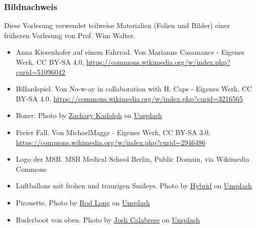 \documentclass{beamer}
\begin{document}
\begin{frame}
\frametitle{Bildnachweis}
 
Diese Vorlesung verwendet teilweise Materialien (Folien und Bilder) einer früheren Vorlesung von Prof. Wim Walter.  

\vfill

\begin{tiny}
 
\begin{itemize}

\item
Anna Kiesenhofer auf einem Fahrrad. Von Marianne Casamance - Eigenes Werk, CC BY-SA 4.0, \url{https://commons.wikimedia.org/w/index.php?curid=51096042}

\item
Billardspiel. Von No-w-ay in collaboration with H. Caps - Eigenes Werk, CC BY-SA 4.0, \url{https://commons.wikimedia.org/w/index.php?curid=3216565}

\item
Boxer. Photo by \href{https://unsplash.com/@zacharykadolph?utm_source=unsplash&utm_medium=referral&utm_content=creditCopyText}{Zachary Kadolph} on \href{https://unsplash.com/s/photos/boxer?utm_source=unsplash&utm_medium=referral&utm_content=creditCopyText}{Unsplash}

\item
Freier Fall. Von MichaelMaggs - Eigenes Werk, CC BY-SA 3.0, \url{https://commons.wikimedia.org/w/index.php?curid=2946486}

\item
Logo der MSB. MSB Medical School Berlin, Public Domain, via Wikimedia Commons

\item
Luftballons mit frohen und traurigen Smileys. Photo by \href{https://unsplash.com/@artbyhybrid?utm_source=unsplash&utm_medium=referral&utm_content=creditCopyText}{Hybrid} on \href{https://unsplash.com/s/photos/feedback?utm_source=unsplash&utm_medium=referral&utm_content=creditCopyText}{Unsplash}
  
\item
Pirouette. Photo by \href{https://unsplash.com/@rodlong?utm_source=unsplash&utm_medium=referral&utm_content=creditCopyText}{Rod Long} on \href{https://unsplash.com/s/photos/figure-skater?utm_source=unsplash&utm_medium=referral&utm_content=creditCopyText}{Unsplash}  

\item
Ruderboot von oben. Photo by \href{https://unsplash.com/@joshcala?utm_source=unsplash&utm_medium=referral&utm_content=creditCopyText}{Josh Calabrese} on \href{https://unsplash.com/s/photos/rowing?utm_source=unsplash&utm_medium=referral&utm_content=creditCopyText}{Unsplash}
  


\end{itemize}
\end{tiny}
\end{frame}
\end{document}
